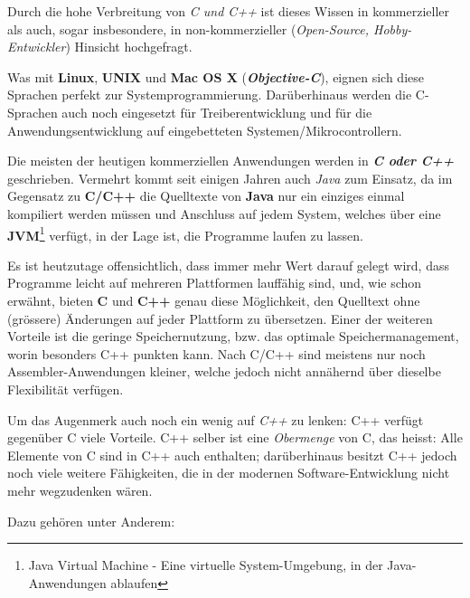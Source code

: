 \documentclass[b5paper,10pt,dvips,fleqn,titlepage,twoside]{book}
\begin{document}
Durch die hohe Verbreitung von \emph{C und C++} ist dieses Wissen in kommerzieller als auch, sogar insbesondere, in non-kommerzieller (\emph{Open-Source, Hobby-Entwickler}) Hinsicht hochgefragt.

Was mit \textbf{Linux}, \textbf{UNIX} und \textbf{Mac OS X} (\emph{\textbf{Objective-C}}), eignen sich diese Sprachen perfekt zur Systemprogrammierung. Darüberhinaus werden die C-Sprachen auch noch eingesetzt für Treiberentwicklung und für die Anwendungsentwicklung auf eingebetteten Systemen/Mikrocontrollern.

Die meisten der heutigen kommerziellen Anwendungen werden in \emph{\textbf{C oder C++}} geschrieben. Vermehrt kommt seit einigen Jahren auch \emph{Java} zum Einsatz, da im Gegensatz zu \textbf{C/C++} die Quelltexte von \textbf{Java} nur ein einziges einmal kompiliert werden müssen und Anschluss auf jedem System, welches über eine \textbf{\textbf{JVM}}\footnote{Java Virtual Machine - Eine virtuelle System-Umgebung, in der Java-Anwendungen ablaufen} verfügt, in der Lage ist, die Programme laufen zu lassen.

Es ist heutzutage offensichtlich, dass immer mehr Wert darauf gelegt wird, dass Programme leicht auf mehreren Plattformen lauffähig sind, und, wie schon erwähnt, bieten \textbf{C} und \textbf{C++} genau diese Möglichkeit, den Quelltext ohne (grössere) Änderungen auf jeder Plattform zu übersetzen. Einer der weiteren Vorteile ist die geringe Speichernutzung, bzw. das optimale Speichermanagement, worin besonders C++ punkten kann. Nach C/C++ sind meistens nur noch Assembler-Anwendungen kleiner, welche jedoch nicht annähernd über dieselbe Flexibilität verfügen.

Um das Augenmerk auch noch ein wenig auf \emph{C++} zu lenken: C++ verfügt gegenüber C viele Vorteile. C++ selber ist eine \emph{Obermenge} von C, das heisst: Alle Elemente von C sind in C++ auch enthalten; darüberhinaus besitzt C++ jedoch noch viele weitere Fähigkeiten, die in der modernen Software-Entwicklung nicht mehr wegzudenken wären.

Dazu gehören unter Anderem:\newline
\end{document}
